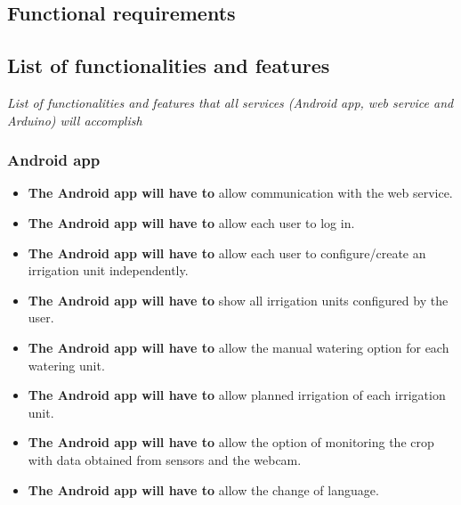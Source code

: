 \documentclass[11pt,a4paper]{article}
\begin{document}
\subsection{Functional requirements}
\subsection{List of functionalities and features}
\textit{List of functionalities and features that all services (Android app, web service and Arduino) will accomplish}

\subsubsection{Android app}
\begin{itemize}
\item \textbf{The Android app will have to} allow communication with the web service.

\item \textbf{The Android app will have to} allow each user to log in.

\item \textbf{The Android app will have to} allow each user to configure/create an irrigation unit independently.

\item \textbf{The Android app will have to} show all irrigation units configured by the user.

\item \textbf{The Android app will have to} allow the manual watering option for each watering unit.

\item \textbf{The Android app will have to} allow planned irrigation of each irrigation unit.

\item \textbf{The Android app will have to} allow the option of monitoring the crop with data obtained from sensors and the webcam.

\item \textbf{The Android app will have to} allow the change of language.
\end{itemize}
\end{document}
